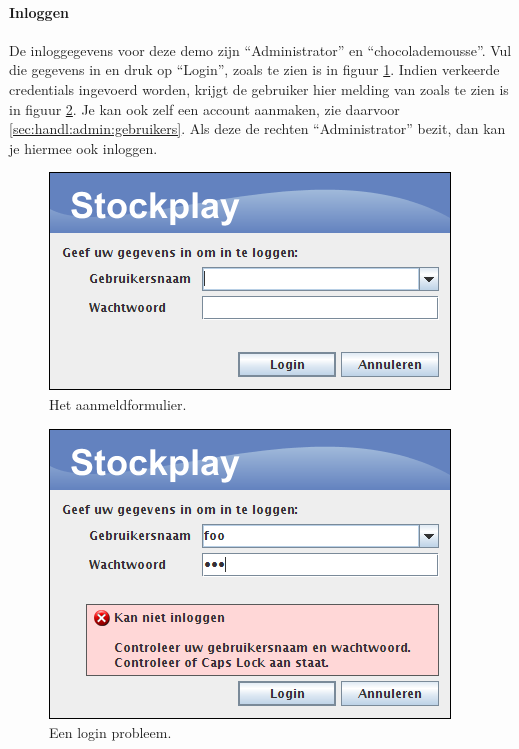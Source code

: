 \paragraph{Inloggen}

De inloggegevens voor deze demo zijn ``Administrator'' en ``chocolademousse''. Vul die gegevens in en druk op ``Login'', zoals te zien is in figuur \ref{fig:handl:admin:login}. Indien verkeerde credentials ingevoerd worden, krijgt de gebruiker hier melding van zoals te zien is in figuur \ref{fig:handl:admin:login-failure}.
Je kan ook zelf een account aanmaken, zie daarvoor \ref{sec:handl:admin:gebruikers}. Als deze de rechten ``Administrator'' bezit, dan kan je hiermee ook inloggen.

\begin{figure}[h!]
	\centering
		\includegraphics[scale=0.75]{images/handleiding/administratie/login}
	\caption{Het aanmeldformulier.}
	\label{fig:handl:admin:login}
\end{figure}

\begin{figure}[h!]
	\centering
		\includegraphics[scale=0.75]{images/handleiding/administratie/login-failure}
	\caption{Een login probleem.}
	\label{fig:handl:admin:login-failure}
\end{figure}

